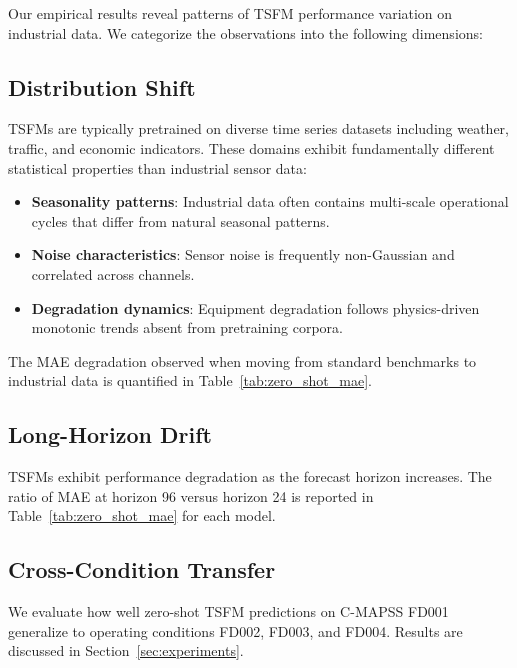 
Our empirical results reveal patterns of TSFM performance variation on industrial data. We categorize the observations into the following dimensions:

\subsection{Distribution Shift}

TSFMs are typically pretrained on diverse time series datasets including weather, traffic, and economic indicators. These domains exhibit fundamentally different statistical properties than industrial sensor data:

\begin{itemize}
    \item \textbf{Seasonality patterns}: Industrial data often contains multi-scale operational cycles that differ from natural seasonal patterns.
    \item \textbf{Noise characteristics}: Sensor noise is frequently non-Gaussian and correlated across channels.
    \item \textbf{Degradation dynamics}: Equipment degradation follows physics-driven monotonic trends absent from pretraining corpora.
\end{itemize}

The MAE degradation observed when moving from standard benchmarks to industrial data is quantified in Table~\ref{tab:zero_shot_mae}. %

\subsection{Long-Horizon Drift}

TSFMs exhibit performance degradation as the forecast horizon increases. The ratio of MAE at horizon 96 versus horizon 24 is reported in Table~\ref{tab:zero_shot_mae} for each model. %

\subsection{Cross-Condition Transfer}

We evaluate how well zero-shot TSFM predictions on C-MAPSS FD001 generalize to operating conditions FD002, FD003, and FD004. Results are discussed in Section~\ref{sec:experiments}. %

